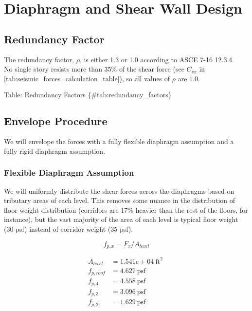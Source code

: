 \documentclass[11pt]{article}
\begin{document}
    
    \section{Diaphragm and Shear Wall
Design}\label{diaphragm-and-shear-wall-design}

    \subsection{Redundancy Factor}\label{redundancy-factor}

The redundancy factor, \(\rho\), is either 1.3 or 1.0 according to ASCE
7-16 12.3.4.\\

No single story resists more than 35\% of the shear force (see
\(C_{vx}\) in \autoref{tab:seismic_forces_calculation_table}), so all
values of \(\rho\) are \(1.0\).

Table: Redundancy Factors \{\#tab:redundancy\_factors\}

    \subsection{Envelope Procedure}\label{envelope-procedure}

We will envelope the forces with a fully flexible diaphragm assumption
and a fully rigid diaphragm assumption.

    \subsubsection{Flexible Diaphragm
Assumption}\label{flexible-diaphragm-assumption}

We will uniformly distribute the shear forces across the diaphragms
based on tributary areas of each level. This removes some nuance in the
distribution of floor weight distribution (corridors are 17\% heavier
than the rest of the floors, for instance), but the vast majority of the
area of each level is typical floor weight (30 psf) instead of corridor
weight (35 psf).

    \[
f_{p,x} = F_x / A_{level}
\]

    \begin{equation*}
\begin{aligned}
A_{level} &= 1.541e+04\ \mathrm{ft}^{2} \; 
\\
f_{p,roof} &= 4.627\ \mathrm{psf} \; 
\\
f_{p,4} &= 4.558\ \mathrm{psf} \; 
\\
f_{p,3} &= 3.096\ \mathrm{psf} \; 
\\
f_{p,2} &= 1.629\ \mathrm{psf} \; 
\end{aligned}
\end{equation*}
\end{document}
